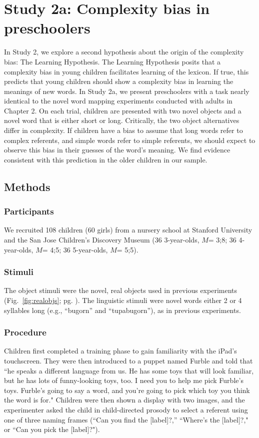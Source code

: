 \section{Study 2a: Complexity bias in preschoolers }


In Study 2, we explore a second hypothesis about the origin of the complexity bias: The Learning Hypothesis. The Learning Hypothesis posits that a complexity bias in young children facilitates learning of the lexicon. If true, this predicts that young children should show a complexity bias in learning the meanings of new words. In Study 2a, we present preschoolers with a task nearly identical to the novel word mapping experiments conducted with adults in Chapter 2. On each trial, children are presented with two novel objects and a novel word that is either short or long. Critically, the two object alternatives differ in complexity. If children have a bias to assume that long words refer to complex referents, and simple words refer to simple referents, we should expect to observe this bias in their guesses of the word's meaning.  We find evidence consistent with this prediction in the older children in our sample. 

\subsection{Methods}
\subsubsection{Participants} We recruited 108 children (60 girls) from a nursery school at Stanford University and the San Jose Children's Discovery Museum (36 3-year-olds, $M$= 3;8; 36 4-year-olds, $M$= 4;5; 36 5-year-olds, $M$= 5;5). 
\subsubsection{Stimuli} 
The object stimuli were the novel, real objects used in previous experiments (Fig.\ \ref{fig:realobjs};  pg. \pageref{novelrealobjs}). The linguistic stimuli were novel words either 2 or 4 syllables long (e.g., ``bugorn'' and ``tupabugorn''), as in previous experiments.

\subsubsection{Procedure} 
Children first completed a training phase to gain familiarity with  the iPad's touchscreen. They were then introduced to a puppet named Furble and told that  ``he speaks a different language from us. He has some toys that will look familiar, but he has lots of funny-looking toys, too. I need you to help me pick Furble's toys. Furble's going to say a word, and you're going to pick which toy you think the word is for." Children were then shown a display with two images, and the experimenter  asked the child in child-directed prosody to select a referent using one of three naming frames (``Can you find the [label]?,'' ``Where's the [label]?,"  or ``Can you pick the [label]?").

